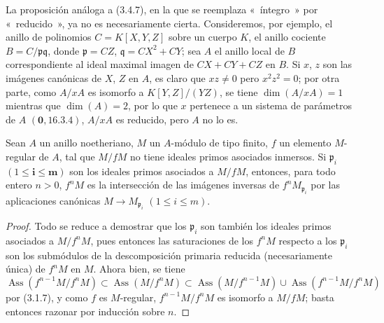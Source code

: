 \begin{remark}[3.4.8]
\label{IV.2.3.4.8-fr}
La proposición análoga a (3.4.7), en la que se reemplaza «~íntegro~» por
«~reducido~», ya no es necesariamente cierta. Consideremos, por ejemplo, el
anillo de polinomios $C=K[X,Y,Z]$ sobre un cuerpo $K$, el anillo cociente
$B=C/\mathfrak p\mathfrak q$, donde $\mathfrak p=CZ$,
$\mathfrak q=CX^2+CY$; sea $A$ el anillo local de $B$ correspondiente al ideal
maximal imagen de $CX+CY+CZ$ en $B$. Si $x$, $z$ son las imágenes canónicas de
$X$, $Z$ en $A$, es claro que $xz\neq0$ pero $x^2z^2=0$; por otra parte, como
$A/xA$ es isomorfo a $K[Y,Z]/(YZ)$, se tiene $\dim(A/xA)=1$ mientras que
$\dim(A)=2$, por lo que $x$ pertenece a un sistema de parámetros de $A$
$(\mathbf{0},16.3.4)$, $A/xA$ es reducido, pero $A$ no lo es.
\end{remark}

\begin{proposition}[3.4.9]
\label{IV.2.3.4.9-fr}
Sean $A$ un anillo noetheriano, $M$ un $A$-módulo de tipo finito, $f$ un
elemento $M$-regular de $A$, tal que $M/fM$ no tiene ideales primos
asociados inmersos. Si $\mathfrak p_i$ $(1\leqslant\boldsymbol{i\leqslant m})$ son los
ideales primos asociados a $M/fM$, entonces, para todo entero $n>0$, $f^nM$
es la intersección de las imágenes inversas de $f^nM_{\mathfrak p_i}$ por
las aplicaciones canónicas $M\to M_{\mathfrak p_i}$ $(1\leqslant i\leqslant m)$.
\end{proposition}

\begin{proof}
Todo se reduce a demostrar que los $\mathfrak p_i$ son también los ideales
primos asociados a $M/f^nM$, pues entonces las saturaciones de los $f^nM$ respecto
a los $\mathfrak p_i$ son los submódulos de la descomposición primaria reducida
(necesariamente única) de $f^nM$ en $M$. Ahora bien, se tiene
\[
\operatorname{Ass}(f^{n-1}M/f^nM)
\subset\operatorname{Ass}(M/f^nM)
\subset\operatorname{Ass}(M/f^{n-1}M)
\cup\operatorname{Ass}(f^{n-1}M/f^nM)
\]
por (3.1.7), y como $f$ es $M$-regular,
$f^{n-1}M/f^nM$ es isomorfo a $M/fM$; basta entonces razonar por
inducción sobre $n$.
\end{proof}

